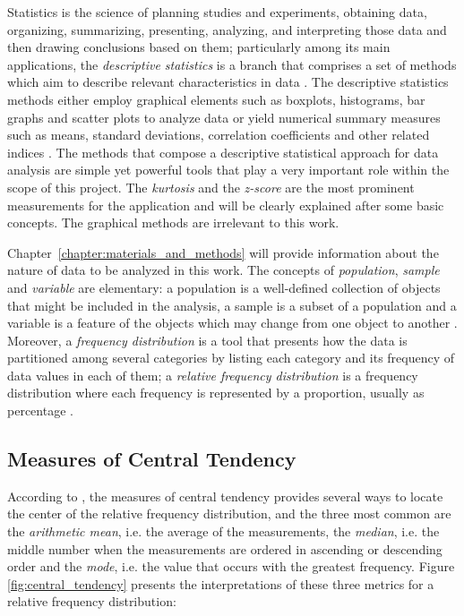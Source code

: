 Statistics is the science of planning studies and experiments, obtaining data, organizing, summarizing, presenting, analyzing, and interpreting those data and then drawing conclusions based on them; particularly among its main applications, the \emph{descriptive statistics} is a branch that comprises a set of methods which aim to describe relevant characteristics in data \cite{triola2017elementary}. The descriptive statistics methods either employ graphical elements such as boxplots, histograms, bar graphs and scatter plots to analyze data or yield numerical summary measures such as means, standard deviations, correlation coefficients and other related indices \cite{devore2011probability}. The methods that compose a descriptive statistical approach for data analysis are simple yet powerful tools that play a very important role within the scope of this project. The \emph{kurtosis} and the \emph{z-score} are the most prominent measurements for the application and will be clearly explained after some basic concepts. The graphical methods are irrelevant to this work.

Chapter~\ref{chapter:materials_and_methods} will provide information about the nature of data to be analyzed in this work. The concepts of \emph{population}, \emph{sample} and \emph{variable} are elementary: a population is a well-defined collection of objects that might be included in the analysis, a sample is a subset of a population and a variable is a feature of the objects which may change from one object to another \cite{devore2011probability}. Moreover, a \emph{frequency distribution} is a tool that presents how the data is partitioned among several categories by listing each category and its frequency of data values in each of them; a \emph{relative frequency distribution} is a frequency distribution where each frequency is represented by a proportion, usually as percentage \cite{triola2017elementary}.

\subsection{Measures of Central Tendency}

According to , the measures of central tendency provides several ways to locate the center of the relative frequency distribution, and the three most common are the \emph{arithmetic mean}, i.e. the average of the measurements, the \emph{median}, i.e. the middle number when the measurements are ordered in ascending or descending order and the \emph{mode}, i.e. the value that occurs with the greatest frequency. Figure \ref{fig:central_tendency} presents the interpretations of these three metrics for a relative frequency distribution:

